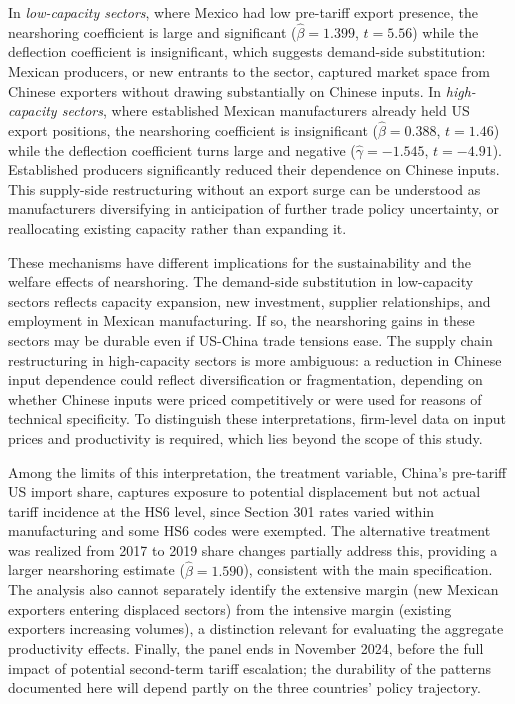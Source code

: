\documentclass[11pt]{article}
\begin{document}
In \textit{low-capacity sectors}, where Mexico had low pre-tariff
export presence, the nearshoring coefficient is large and significant
($\hat{\beta} = 1.399$, $t = 5.56$) while the deflection coefficient is
insignificant, which suggests demand-side substitution:
Mexican producers, or new entrants to the sector, captured market space
from Chinese exporters without drawing substantially on Chinese
inputs. In \textit{high-capacity sectors}, where established Mexican
manufacturers already held US export positions, the nearshoring
coefficient is insignificant ($\hat{\beta} = 0.388$, $t = 1.46$) while the deflection coefficient turns large and negative
($\hat{\gamma} = -1.545$, $t = -4.91$). Established producers
significantly reduced their dependence on Chinese inputs. This supply-side
restructuring without an export surge can be understood as
manufacturers diversifying in anticipation of further
trade policy uncertainty, or reallocating existing capacity rather than
expanding it.

These mechanisms have different implications for the sustainability
and the welfare effects of nearshoring. The demand-side substitution in
low-capacity sectors reflects capacity expansion, new
investment, supplier relationships, and employment in Mexican manufacturing. If so, the nearshoring gains in
these sectors may be durable even if US-China trade tensions ease. The supply chain
restructuring in high-capacity sectors is more ambiguous: a reduction in
Chinese input dependence could reflect diversification
or fragmentation, depending on whether Chinese inputs
were priced competitively or were used for reasons of technical
specificity. To distinguish these interpretations, firm-level
data on input prices and productivity is required, which lies beyond the scope of this
study.

Among the limits of this interpretation, the treatment variable, China's pre-tariff US import share, captures exposure to potential
displacement but not actual tariff incidence at the HS6 level, since
Section 301 rates varied within manufacturing and some HS6
codes were exempted. The alternative treatment was realized from 2017 to 2019
share changes partially address this, providing a larger nearshoring
estimate ($\hat{\beta} = 1.590$), consistent with the main specification.
The analysis also cannot separately identify the extensive margin (new
Mexican exporters entering displaced sectors) from the intensive margin
(existing exporters increasing volumes), a distinction relevant for
evaluating the aggregate productivity effects. Finally, the panel ends in November 2024, before the full impact of potential second-term tariff escalation; the durability of the patterns documented here will depend partly on the three countries' policy trajectory.
\end{document}
